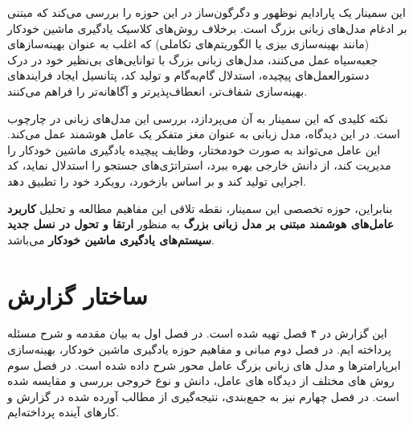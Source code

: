 این سمینار یک پارادایم نوظهور و دگرگون‌ساز در این حوزه را بررسی می‌کند که مبتنی بر ادغام مدل‌های زبانی بزرگ است. برخلاف روش‌های کلاسیک یادگیری ماشین خودکار (مانند بهینه‌سازی بیزی یا الگوریتم‌های تکاملی) که اغلب به عنوان بهینه‌سازهای جعبه‌سیاه عمل می‌کنند، مدل‌های زبانی بزرگ با توانایی‌های بی‌نظیر خود در درک دستورالعمل‌های پیچیده، استدلال گام‌به‌گام و تولید کد، پتانسیل ایجاد فرایندهای بهینه‌سازی شفاف‌تر، انعطاف‌پذیرتر و آگاهانه‌تر را فراهم می‌کنند.

نکته کلیدی که این سمینار به آن می‌پردازد، بررسی این مدل‌های زبانی در چارچوب  است. در این دیدگاه، مدل زبانی به عنوان مغز متفکر یک عامل هوشمند عمل می‌کند. این عامل می‌تواند به صورت خودمختار، وظایف پیچیده یادگیری ماشین خودکار را مدیریت کند، از دانش خارجی بهره ببرد، استراتژی‌های جستجو را استدلال نماید، کد اجرایی تولید کند و بر اساس بازخورد، رویکرد خود را تطبیق دهد.

بنابراین، حوزه تخصصی این سمینار، نقطه تلاقی این مفاهیم مطالعه و تحلیل \textbf{کاربرد عامل‌های هوشمند مبتنی بر مدل زبانی بزرگ} به منظور \textbf{ارتقا و تحول در نسل جدید سیستم‌های یادگیری ماشین خودکار }می‌باشد.

\section{ساختار گزارش}
این گزارش در ۴ فصل تهیه شده است. در فصل اول به بیان مقدمه و شرح مسئله پرداخته ایم. در فصل دوم مبانی و مفاهیم حوزه یادگیری ماشین خودکار، بهینه‌سازی ابرپارامترها و مدل های زبانی بزرگ عامل محور شرح داده شده است. در فصل سوم روش های مختلف از دیدگاه های عامل، دانش و نوع خروجی بررسی و مقایسه شده است. در فصل چهارم نیز به جمع‌بندی، نتیجه‌گیری از مطالب آورده شده در گزارش و کارهای آینده پرداخته‌ایم.
